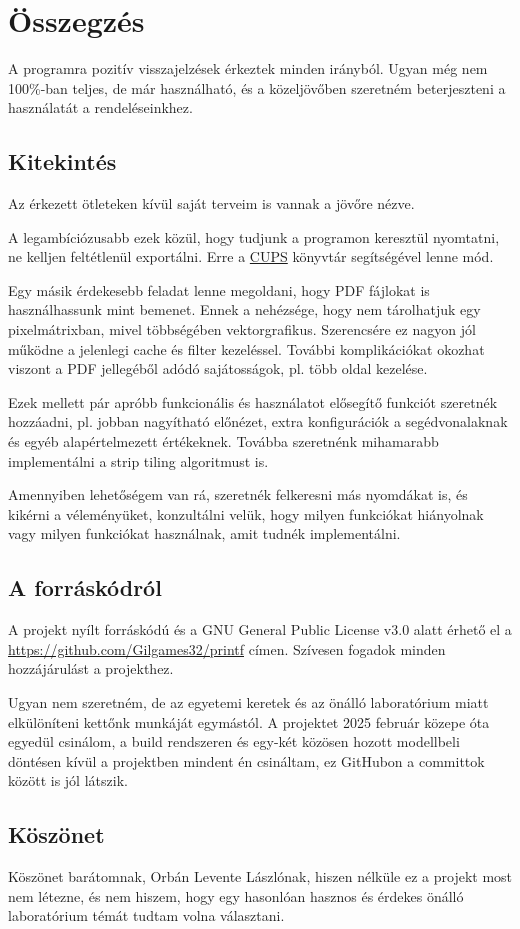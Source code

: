 \chapter{Összegzés}

A programra pozitív visszajelzések érkeztek minden irányból. Ugyan még nem 100\%-ban teljes, de már használható, és a közeljövőben szeretném beterjeszteni a használatát a rendeléseinkhez.

\section{Kitekintés}

Az érkezett ötleteken kívül saját terveim is vannak a jövőre nézve.

A legambíciózusabb ezek közül, hogy tudjunk a programon keresztül nyomtatni, ne kelljen feltétlenül exportálni. Erre a \href{https://en.wikipedia.org/wiki/CUPS}{CUPS} könyvtár segítségével lenne mód.

Egy másik érdekesebb feladat lenne megoldani, hogy PDF fájlokat is használhassunk mint bemenet. Ennek a nehézsége, hogy nem tárolhatjuk egy pixelmátrixban, mivel többségében vektorgrafikus. Szerencsére ez nagyon jól működne a jelenlegi cache és filter kezeléssel. További komplikációkat okozhat viszont a PDF jellegéből adódó sajátosságok, pl. több oldal kezelése.

Ezek mellett pár apróbb funkcionális és használatot elősegítő funkciót szeretnék hozzáadni, pl. jobban nagyítható előnézet, extra konfigurációk a segédvonalaknak és egyéb alapértelmezett értékeknek. Továbba szeretnénk mihamarabb implementálni a strip tiling algoritmust is.

Amennyiben lehetőségem van rá, szeretnék felkeresni más nyomdákat is, és kikérni a véleményüket, konzultálni velük, hogy milyen funkciókat hiányolnak vagy milyen funkciókat használnak, amit tudnék implementálni.

\section{A forráskódról}

A projekt nyílt forráskódú és a GNU General Public License v3.0 alatt érhető el a \href{https://github.com/Gilgames32/printf}{https://github.com/Gilgames32/printf} címen. Szívesen fogadok minden hozzájárulást a projekthez. 

Ugyan nem szeretném, de az egyetemi keretek és az önálló laboratórium miatt elkülöníteni kettőnk munkáját egymástól. A projektet 2025 február közepe óta egyedül csinálom, a build rendszeren és egy-két közösen hozott modellbeli döntésen kívül a projektben mindent én csináltam, ez GitHubon a committok között is jól látszik.

\section{Köszönet}

Köszönet barátomnak, Orbán Levente Lászlónak, hiszen nélküle ez a projekt most nem létezne, és nem hiszem, hogy egy hasonlóan hasznos és érdekes önálló laboratórium témát tudtam volna választani.
